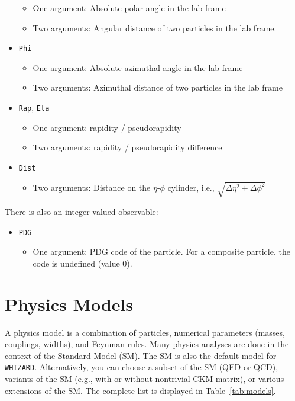 \documentclass[12pt]{book}
\newcommand{\ttt}[1]{\texttt{#1}}
\newcommand{\whizard}{\texttt{WHIZARD}}
\begin{document}
\begin{itemize}
\begin{itemize}
  \item One argument: Absolute polar angle in the lab frame
  \item Two arguments: Angular distance of two particles in the lab frame.
  \end{itemize}
\item \ttt{Phi}
  \begin{itemize}
  \item One argument: Absolute azimuthal angle in the lab frame
  \item Two arguments: Azimuthal distance of two particles in the lab frame
  \end{itemize}
\item \ttt{Rap}, \ttt{Eta}
  \begin{itemize}
  \item One argument: rapidity / pseudorapidity
  \item Two arguments: rapidity / pseudorapidity difference
  \end{itemize}
\item \ttt{Dist}
  \begin{itemize}
  \item Two arguments: Distance on the $\eta$-$\phi$ cylinder, i.e.,
    $\sqrt{\Delta\eta^2 + \Delta\phi^2}$
  \end{itemize}
\end{itemize}
There is also an integer-valued observable:
\begin{itemize}
\item \ttt{PDG}
  \begin{itemize}
  \item One argument: PDG code of the particle.  For a composite particle, the
    code is undefined (value 0).
  \end{itemize}
\end{itemize}


\section{Physics Models}
\label{sec:models}

A physics model is a combination of particles, numerical parameters (masses,
couplings, widths), and Feynman rules.  Many physics analyses are done in the
context of the Standard Model (SM).  The SM is also the default model for
\whizard.  Alternatively, you can choose a subset of the SM (QED or QCD),
variants of the SM (e.g., with or without nontrivial CKM matrix), or various
extensions of the SM.  The complete list is displayed in
Table~\ref{tab:models}.
\end{document}
